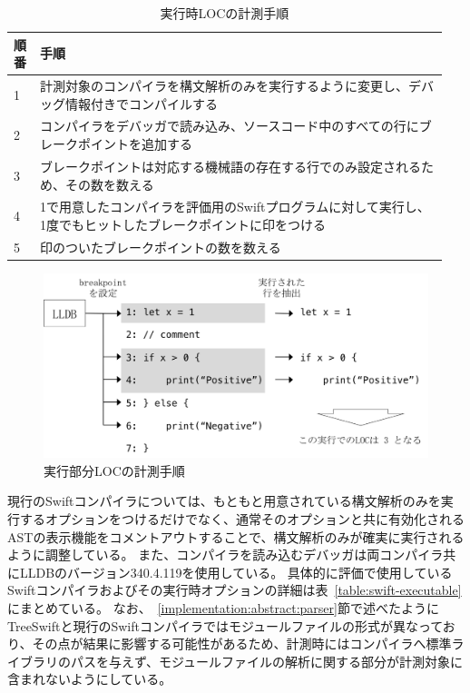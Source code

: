 \begin{table}[!hbtp]
    \begin{center}
        \caption{実行時LOCの計測手順}
        \begin{tabular}{|p{0.05\linewidth}|p{0.9\linewidth}|}
            \hline
            順番 & 手順 \\
            \hline
            \hline
            1 & 計測対象のコンパイラを構文解析のみを実行するように変更し、デバッグ情報付きでコンパイルする \\
            \hline
            2 & コンパイラをデバッガで読み込み、ソースコード中のすべての行にブレークポイントを追加する \\
            \hline
            3 & ブレークポイントは対応する機械語の存在する行でのみ設定されるため、その数を数える \\
            \hline
            4 & 1で用意したコンパイラを評価用のSwiftプログラムに対して実行し、1度でもヒットしたブレークポイントに印をつける \\
            \hline
            5 & 印のついたブレークポイントの数を数える \\
            \hline
        \end{tabular}
        \label{table:complexity-measure}
    \end{center}
\end{table}

\begin{figure}
    \begin{center}
        \includegraphics[scale=0.8]{./img/loc_measurement.png}
        \caption{実行部分LOCの計測手順}
        \label{img:loc-measurement}
    \end{center}
\end{figure}

現行のSwiftコンパイラについては、もともと用意されている構文解析のみを実行するオプションをつけるだけでなく、通常そのオプションと共に有効化されるASTの表示機能をコメントアウトすることで、構文解析のみが確実に実行されるように調整している。
また、コンパイラを読み込むデバッガは両コンパイラ共にLLDBのバージョン340.4.119を使用している。
具体的に評価で使用しているSwiftコンパイラおよびその実行時オプションの詳細は表~\ref{table:swift-executable}にまとめている。
なお、~\ref{implementation:abstract:parser}節で述べたようにTreeSwiftと現行のSwiftコンパイラではモジュールファイルの形式が異なっており、その点が結果に影響する可能性があるため、計測時にはコンパイラへ標準ライブラリのパスを与えず、モジュールファイルの解析に関する部分が計測対象に含まれないようにしている。

